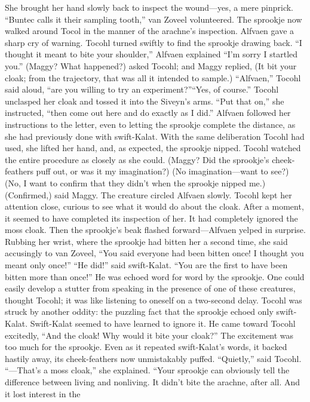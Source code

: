 \documentclass[9pt]{article}
\begin{document}
She brought her hand slowly back to inspect the wound—yes, a mere pinprick.
“Buntec calls it their sampling tooth,” van Zoveel volunteered. The sprookje now walked around
Tocol in the manner of the arachne’s inspection.
Alfvaen gave a sharp cry of warning. Tocohl turned swiftly to find the sprookje drawing back. “I
thought it meant to bite your shoulder,” Alfvaen explained “I’m sorry I startled you.”
(Maggy? What happened?) asked Tocohl; and Maggy replied, (It bit your cloak; from the trajectory,
that was all it intended to sample.)
“Alfvaen,” Tocohl said aloud, “are you willing to try an experiment?”“Yes, of course.”
Tocohl unclasped her cloak and tossed it into the Siveyn’s arms. “Put that on,” she instructed, “then
come out here and do exactly as I did.”
Alfvaen followed her instructions to the letter, even to letting the sprookje complete the distance, as
she had previously done with swift-Kalat. With the same deliberation Tocohl had used, she lifted her
hand, and, as expected, the sprookje nipped. Tocohl watched the entire procedure as closely as she
could. (Maggy? Did the sprookje’s cheek-feathers puff out, or was it my imagination?)
(No imagination—want to see?)
(No, I want to confirm that they didn’t when the sprookje nipped me.)
(Confirmed,) said Maggy.
The creature circled Alfvaen slowly. Tocohl kept her attention close, curious to see what it would do
about the cloak. After a moment, it seemed to have completed its inspection of her. It had completely
ignored the moss cloak.
Then the sprookje’s beak flashed forward—Alfvaen yelped in surprise. Rubbing her wrist, where the
sprookje had bitten her a second time, she said accusingly to van Zoveel, “You said everyone had been
bitten once! I thought you meant only once!”
“He did!” said swift-Kalat. “You are the first to have been bitten more than once!” He was echoed
word for word by the sprookje.
One could easily develop a stutter from speaking in the presence of one of these creatures, thought
Tocohl; it was like listening to oneself on a two-second delay.
Tocohl was struck by another oddity: the puzzling fact that the sprookje echoed only swift-Kalat.
Swift-Kalat seemed to have learned to ignore it. He came toward Tocohl excitedly, “And the cloak!
Why would it bite your cloak?”
The excitement was too much for the sprookje. Even as it repeated swift-Kalat’s words, it backed
hastily away, its cheek-feathers now unmistakably puffed.
“Quietly,” said Tocohl. “—That’s a moss cloak,” she explained. “Your sprookje can obviously tell
the difference between living and nonliving. It didn’t bite the arachne, after all. And it lost interest in the
\end{document}
